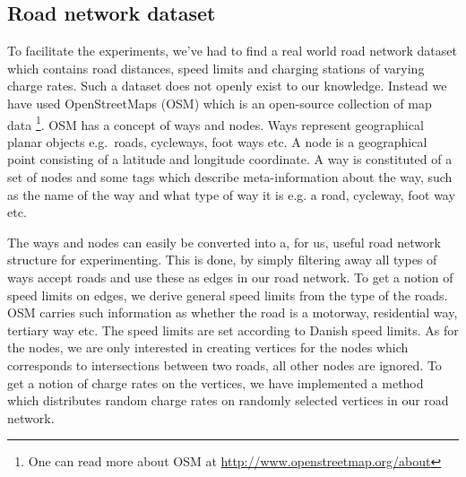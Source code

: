 \subsection{Road network dataset} 
\label{sub:setup}
To facilitate the experiments, we've had to find a real world road network dataset which contains road distances, speed limits and charging stations of varying charge rates. Such a dataset does not openly exist to our knowledge. Instead we have used OpenStreetMaps (OSM) which is an open-source collection of map data \footnote{One can read more about OSM at \url{http://www.openstreetmap.org/about}}. OSM has a concept of ways and nodes. Ways represent geographical planar objects e.g.\ roads, cycleways, foot ways etc. A node is a geographical point consisting of a latitude and longitude coordinate. A way is constituted of a set of nodes and some tags which describe meta-information about the way, such as the name of the way and what type of way it is e.g. a road, cycleway, foot way  etc. 

The ways and nodes can easily be converted into a, for us, useful road network structure for experimenting. This is done, by simply filtering away all types of ways accept roads and use these as edges in our road network. To get a notion of speed limits on edges, we derive general speed limits from the type of the roads. OSM carries such information as whether the road is a motorway, residential way, tertiary way etc. The speed limits are set according to Danish speed limits. As for the nodes, we are only interested in creating vertices for the nodes which corresponds to intersections between two roads, all other nodes are ignored. To get a notion of charge rates on the vertices, we have implemented a method which distributes random charge rates on randomly selected vertices in our road network.
